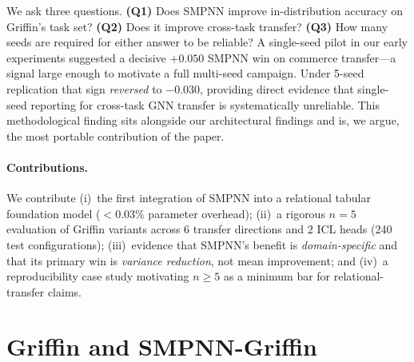 \documentclass{article}
\begin{document}
We ask three questions. \textbf{(Q1)} Does SMPNN improve in-distribution accuracy on Griffin's task set? \textbf{(Q2)} Does it improve cross-task transfer? \textbf{(Q3)} How many seeds are required for either answer to be reliable? A single-seed pilot in our early experiments suggested a decisive $+0.050$ SMPNN win on commerce transfer---a signal large enough to motivate a full multi-seed campaign. Under 5-seed replication that sign \emph{reversed} to $-0.030$, providing direct evidence that single-seed reporting for cross-task GNN transfer is systematically unreliable. This methodological finding sits alongside our architectural findings and is, we argue, the most portable contribution of the paper.

\paragraph{Contributions.} We contribute (i)~the first integration of SMPNN into a relational tabular foundation model ($<$0.03\% parameter overhead); (ii)~a rigorous $n{=}5$ evaluation of Griffin variants across 6 transfer directions and 2 ICL heads (240 test configurations); (iii)~evidence that SMPNN's benefit is \emph{domain-specific} and that its primary win is \emph{variance reduction}, not mean improvement; and (iv)~a reproducibility case study motivating $n\!\ge\!5$ as a minimum bar for relational-transfer claims.

\section{Griffin and SMPNN-Griffin}
\label{sec:arch}
\end{document}
